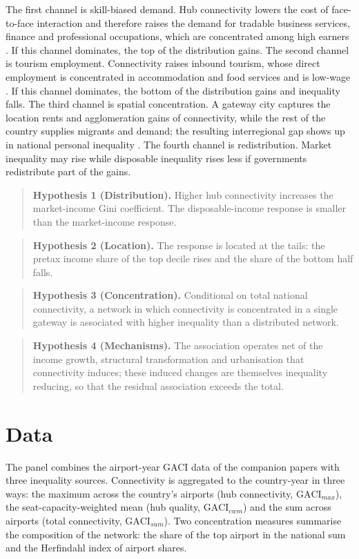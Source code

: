 \documentclass[12pt]{article}
\begin{document}
The first channel is skill-biased demand. Hub connectivity lowers the cost of face-to-face interaction and therefore raises the demand for tradable business services, finance and professional occupations, which are concentrated among high earners \citep{Allen_2014,Brueckner_2003}. If this channel dominates, the top of the distribution gains. The second channel is tourism employment. Connectivity raises inbound tourism, whose direct employment is concentrated in accommodation and food services and is low-wage \citep{Khadaroo_2008}. If this channel dominates, the bottom of the distribution gains and inequality falls. The third channel is spatial concentration. A gateway city captures the location rents and agglomeration gains of connectivity, while the rest of the country supplies migrants and demand; the resulting interregional gap shows up in national personal inequality \citep{Redding_2004}. The fourth channel is redistribution. Market inequality may rise while disposable inequality rises less if governments redistribute part of the gains.

\begin{quote}
\textbf{Hypothesis 1 (Distribution).} Higher hub connectivity increases the market-income Gini coefficient. The disposable-income response is smaller than the market-income response.
\end{quote}
\begin{quote}
\textbf{Hypothesis 2 (Location).} The response is located at the tails: the pretax income share of the top decile rises and the share of the bottom half falls.
\end{quote}
\begin{quote}
\textbf{Hypothesis 3 (Concentration).} Conditional on total national connectivity, a network in which connectivity is concentrated in a single gateway is associated with higher inequality than a distributed network.
\end{quote}
\begin{quote}
\textbf{Hypothesis 4 (Mechanisms).} The association operates net of the income growth, structural transformation and urbanisation that connectivity induces; these induced changes are themselves inequality reducing, so that the residual association exceeds the total.
\end{quote}

\section{Data}
\label{sec:data}
The panel combines the airport-year GACI data of the companion papers with three inequality sources. Connectivity is aggregated to the country-year in three ways: the maximum across the country's airports (hub connectivity, $\mathrm{GACI}_{max}$), the seat-capacity-weighted mean (hub quality, $\mathrm{GACI}_{cwm}$) and the sum across airports (total connectivity, $\mathrm{GACI}_{sum}$). Two concentration measures summarise the composition of the network: the share of the top airport in the national sum and the Herfindahl index of airport shares.
\end{document}
